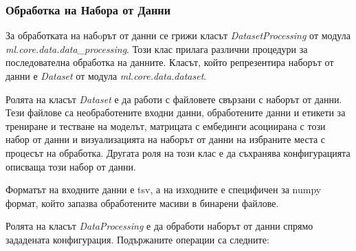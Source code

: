\documentclass{article}
\newcounter{subsubsubsection}[subsubsection]
\begin{document}
\subsubsection{Обработка на Набора от Данни}

За обработката на набoрът от данни се грижи класът \textit{DatasetProcessing} от модула
\textit{ml.core.data.data\_processing}. Този клас прилага различни процедури за последователна обработка на данните.
Класът, който репрезентира наборът от данни е \textit{Dataset} от модула \textit{ml.core.data.dataset}.


Ролята на класът \textit{Dataset} е да работи с файловете свързани с наборът от данни. Тези файлове са необработените
входни данни, обработените данни и етикети за трениране и тестване на моделът, матрицата с ембединги асоциирана с този
набор от данни и визуализацията на наборът от данни на избраните места с процесът на обработка. Другата роля на този
клас е да съхранява конфигурацията описваща този набор от данни.

Форматът на входните данни е tsv, а на изходните е специфичен за numpy формат, който запазва обработените масиви в
бинарени файлове.


Ролята на класът \textit{DataProcessing} е да обработи наборът от данни спрямо зададената конфигурация. Подържаните
операции са следните:
\end{document}
